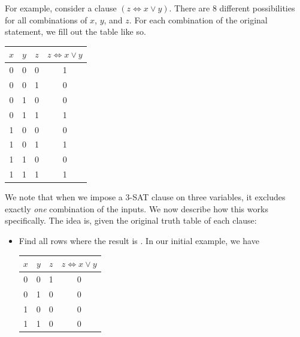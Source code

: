 \documentclass[letterpaper]{article}
\begin{document}
\begin{itemize}
\begin{mdframed}[]
        \bigskip 

        For example, consider a clause $(z \iff x \lor y)$. There are 8 different possibilities for all combinations of $x$, $y$, and $z$. For each combination of the original statement, we fill out the table like so. 
        \begin{center}
            \begin{tabular}{|c|c|c|c|}
                \hline 
                $x$ & $y$ & $z$ & $z \iff x \lor y$ \\ 
                \hline 
                0 & 0 & 0 & 1 \\ 
                0 & 0 & 1 & 0 \\ 
                0 & 1 & 0 & 0 \\ 
                0 & 1 & 1 & 1 \\ 
                1 & 0 & 0 & 0 \\ 
                1 & 0 & 1 & 1 \\ 
                1 & 1 & 0 & 0 \\ 
                1 & 1 & 1 & 1 \\ 
                \hline 
            \end{tabular}
        \end{center}
        We note that when we impose a 3-SAT clause on three variables, it excludes exactly \emph{one} combination of the inputs. We now describe how this works specifically. The idea is, given the original truth table of each clause:
        \begin{itemize}
            \item Find all rows where the result is . In our initial example, we have 
            \begin{center}
                \begin{tabular}{|c|c|c|c|}
                    \hline 
                    $x$ & $y$ & $z$ & $z \iff x \lor y$ \\ 
                    \hline 
                    0 & 0 & 1 & 0 \\ 
                    0 & 1 & 0 & 0 \\ 
                    1 & 0 & 0 & 0 \\ 
                    1 & 1 & 0 & 0 \\ 
                    \hline 
                \end{tabular}
            \end{center}
    

\end{itemize}
\end{mdframed}
\end{itemize}
\end{document}
